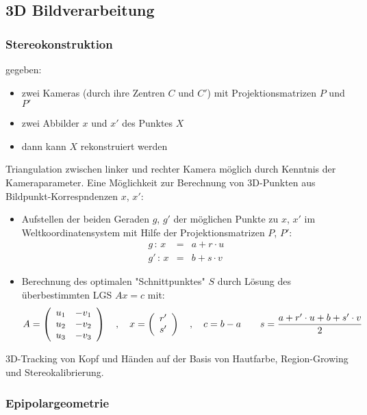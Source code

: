 \subsection{3D Bildverarbeitung}

\subsubsection*{Stereokonstruktion}

gegeben:
\begin{itemize}
\item zwei Kameras (durch ihre Zentren $C$ und $C'$) mit Projektionsmatrizen $P$ und $P'$
\item zwei Abbilder $x$ und $x'$ des Punktes $X$
\item dann kann $X$ rekonstruiert werden
\end{itemize}
Triangulation zwischen linker und rechter Kamera möglich durch Kenntnis der Kameraparameter. Eine Möglichkeit zur Berechnung von 3D-Punkten aus Bildpunkt-Korrespndenzen $x$, $x'$:
\begin{itemize}
\item Aufstellen der beiden Geraden $g$, $g'$ der möglichen Punkte zu $x$, $x'$ im Weltkoordinatensystem mit Hilfe der Projektionsmatrizen $P$, $P'$:
\begin{eqnarray*}
g \, : \, x &=& a + r \cdot u \\ g' \, : \, x &=& b + s \cdot v
\end{eqnarray*}
\item Berechnung des optimalen "{}Schnittpunktes"{} $S$ durch Lösung des überbestimmten LGS $Ax = c$ mit: $$A = \left( \begin{array}{cc} u_1 & -v_1 \\ u_2 & -v_2 \\ u_3 & -v_3 \end{array} \right) \quad , \quad x = \left( \begin{array}{c} r' \\ s' \end{array} \right) \quad , \quad c = b-a \qquad s = \frac{a + r' \cdot u + b + s' \cdot v}{2}$$
\end{itemize}
3D-Tracking von Kopf und Händen auf der Basis von Hautfarbe, Region-Growing und Stereokalibrierung.

\subsubsection*{Epipolargeometrie}


